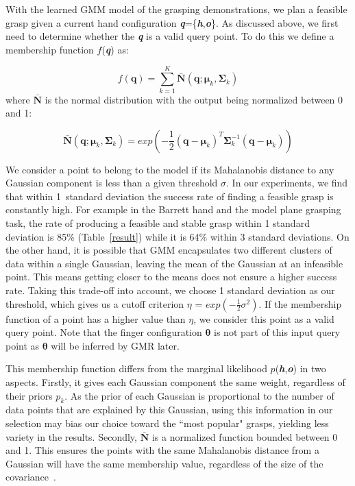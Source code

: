 With the learned GMM model of the grasping demonstrations, we plan a feasible grasp given a current hand configuration \textbf{\emph{q}}=\{\textbf{\emph{h}},\textbf{\emph{o}}\}. As discussed above, we first need to determine whether the \textbf{\emph{q}} is a valid query point. To do this we define a membership function $f$(\textbf{\emph{q}}) as:

\begin{equation}
f(\boldsymbol{q}) = \sum_{k=1}^{K}\bar{\boldsymbol{N}}(\boldsymbol{q};\boldsymbol{\mu}_k,\boldsymbol{\Sigma}_k)
\end{equation}
where $\bar{\boldsymbol{N}}$ is the normal distribution with the output being normalized between 0 and 1:

\begin{equation}
\bar{\boldsymbol{N}}(\boldsymbol{q};\boldsymbol{\mu}_k,\boldsymbol{\Sigma}_k) = exp\left(-\frac{1}{2}(\boldsymbol{q}-\boldsymbol{\mu}_k)^{T}\boldsymbol{\Sigma}_k^{-1}(\boldsymbol{q}-\boldsymbol{\mu}_k)\right)
\end{equation}

We consider a point to belong to the model if its Mahalanobis distance to any Gaussian component is less than a given threshold $\sigma$. In our experiments, we find that within 1~standard deviation the success rate of finding a feasible grasp is constantly high. For example in the Barrett hand and the model plane grasping task, the rate of producing a feasible and stable grasp within 1 standard deviation is 85\% (Table~\ref{result}) while it is 64\% within 3 standard deviations. On the other hand, it is possible that GMM encapsulates two different clusters of data within a single Gaussian, leaving the mean of the Gaussian at an infeasible point. This means getting closer to the means does not ensure a higher success rate. Taking this trade-off into account, we choose 1 standard deviation as our threshold, which gives us a cutoff criterion $\eta$ = $exp(-\frac{1}{2}\sigma^2)$. If the membership function of a point has a higher value than $\eta$, we consider this point as a valid query point. Note that the finger configuration $\boldsymbol\theta$ is not part of this input query point as $\boldsymbol\theta$ will be inferred by GMR later.

This membership function differs from the marginal likelihood $p$(\textbf{\emph{h}},\textbf{\emph{o}}) in two aspects. Firstly, it gives each Gaussian component the same weight, regardless of their priors $p_k$. As the prior of each Gaussian is proportional to the number of data points that are explained by this Gaussian, using this information in our selection may bias our choice toward the ``most popular" grasps, yielding less variety in the results.
Secondly, $\bar{\boldsymbol{N}}$ is a normalized function bounded between 0 and 1. This ensures the points with the same Mahalanobis distance from a Gaussian will have the same membership value, regardless of the size of the covariance~\citep{sauser2011iterative}.


